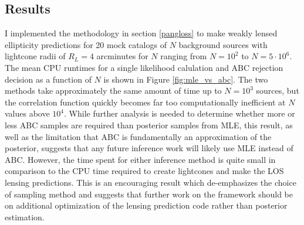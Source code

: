 \documentclass[%
 reprint,
 amsmath,amssymb,
 aps,nofootinbib
]{revtex4-1}
\begin{document}
\subsection{Results} \label{inference_results}

I implemented the methodology in section \ref{pangloss} to make weakly lensed ellipticity predictions for 20 mock catalogs of $N$ background sources with lightcone radii of $R_L=4$ arcminutes for $N$ ranging from $N=10^2$ to $N=5\cdot10^6$. The mean CPU runtimes for a single likelihood calulation and ABC rejection decision as a function of $N$ is shown in Figure \ref{fig:mle_vs_abc}. The two methods take approximately the same amount of time up to $N=10^3$ sources, but the correlation function quickly becomes far too computationally inefficient at $N$ values above $10^4$. While further analysis is needed to determine whether more or less ABC samples are required than posterior samples from MLE, this result, as well as the limitation that ABC is fundamentally an approximation of the posterior, suggests that any future inference work will likely use MLE instead of ABC. However, the time spent for either inference method is quite small in comparison to the CPU time required to create lightcones and make the LOS lensing predictions. This is an encouraging result which de-emphasizes the choice of sampling method and suggests that further work on the framework should be on additional optimization of the lensing prediction code rather than posterior estimation.
\end{document}
